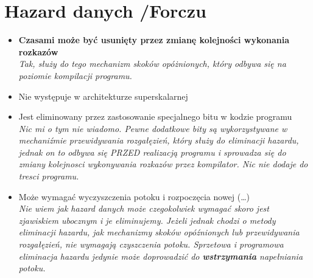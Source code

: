 \documentclass[a4paper,twoside]{article}
\begin{document}
\section{Hazard danych {\small /Forczu}}
	\begin{itemize}
    \item \textbf{Czasami może być usunięty przez zmianę kolejności wykonania rozkazów}\\
    {\small \emph{Tak, służy do tego mechanizm skoków opóżnionych, który odbywa się na poziomie kompilacji programu.}}
    \item Nie występuje w architekturze superskalarnej
    \item Jest eliminowany przez zastosowanie specjalnego bitu w kodzie programu\\
    {\small \emph{Nic mi o tym nie wiadomo. Pewne dodatkowe bity są wykorzystywane w mechaniźmie przewidywania rozgałęzień, który służy do eliminacji hazardu, jednak on to odbywa się PRZED realizacją programu i sprowadza się do zmiany kolejnosci wykonywania rozkazów przez kompilator. Nic nie dodaje do tresci programu.}}
    \item Może wymagać wyczyszczenia potoku i rozpoczęcia nowej (…)\\
    {\small \emph{Nie wiem jak hazard danych może czegokolwiek wymagać skoro jest zjawiskiem ubocznym i je eliminujemy. Jeżeli jednak chodzi o metody eliminacji hazardu, jak mechanizmy skoków opóźnionych lub przewidywania rozgałęzień, nie wymagają czyszczenia potoku. Sprzetowa i programowa eliminacja hazardu jedynie może doprowadzić do \textbf{wstrzymania} napełniania potoku.}}
    \end{itemize}
\end{document}
